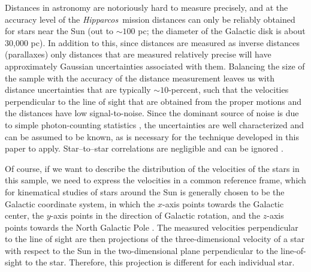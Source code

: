 \documentclass[aoas,preprint,authoryear,round]{imsart}
\newcommand{\Hipparcos}{\emph{Hipparcos}}
\begin{document}
Distances in astronomy are notoriously hard to measure precisely, and
at the accuracy level of the \Hipparcos\ mission distances can only be
reliably obtained for stars near the Sun (out to $\sim\!100$ pc; the
diameter of the Galactic disk is about 30,000 pc). In addition to
this, since distances are measured as inverse distances (parallaxes)
only distances that are measured relatively precise will have
approximately Gaussian uncertainties associated with them. Balancing
the size of the sample with the accuracy of the distance measurement
leaves us with distance uncertainties that are typically
$\sim\!10$-percent, such that the velocities perpendicular to the line
of sight that are obtained from the proper motions and the distances
have low signal-to-noise. Since the dominant source of noise is due to
simple photon-counting statistics \citep{2007ASSL..250.....V}, the
uncertainties are well characterized and can be assumed to be known,
as is necessary for the technique developed in this paper to
apply. Star--to--star correlations are negligible and can be ignored
\citep{2007ASSL..250.....V}.

Of course, if we want to describe the distribution of the velocities
of the stars in this sample, we need to express the velocities in a
common reference frame, which for kinematical studies of stars around
the Sun is generally chosen to be the Galactic coordinate system, in
which the $x$-axis points towards the Galactic center, the $y$-axis
points in the direction of Galactic rotation, and the $z$-axis points
towards the North Galactic Pole
\citep{1960MNRAS.121..123B,1998gaas.book.....B}. The measured
velocities perpendicular to the line of sight are then projections of
the three-dimensional velocity of a star with respect to the Sun in
the two-dimensional plane perpendicular to the line-of-sight to the
star. Therefore, this projection is different for each individual
star.
\end{document}
